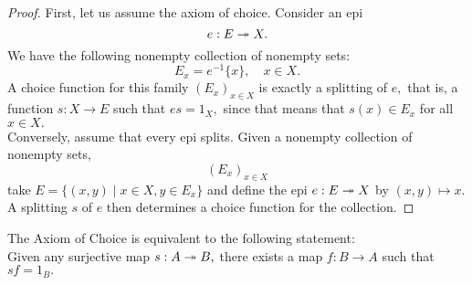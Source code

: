 \begin{proof} 
	First, let us assume the axiom of choice. Consider an epi
	\begin{equation*} 
		e : E \twoheadrightarrow X.
	\end{equation*}
	We have the following nonempty collection of nonempty sets:
	\begin{equation*} 
		E_x = e^{-1}\{x\}, \quad x \in X.
	\end{equation*}
	A choice function for this family $(E_x)_{x \in X}$ is exactly a splitting of $e,$ that is, a function $s:X \to E$ such that $es = 1_X,$ since that means that $s(x) \in E_x$ for all $x \in X.$\\
	Conversely, assume that every epi splits. Given a nonempty collection of nonempty sets,
	\begin{equation*} 
		(E_x)_{x\in X}
	\end{equation*}
	take $E = \{(x, y) \mid x \in X, y \in E_x\}$ and define the epi $e:E\twoheadrightarrow X$ by $(x, y) \mapsto x.$ A splitting $s$ of $e$ then determines a choice function for the collection.
\end{proof}
\begin{cor}
	The Axiom of Choice is equivalent to the following statement:\\
	Given any surjective map $s:A \twoheadrightarrow B,$ there exists a map $f:B\to A$ such that $sf = 1_B.$
\end{cor}
